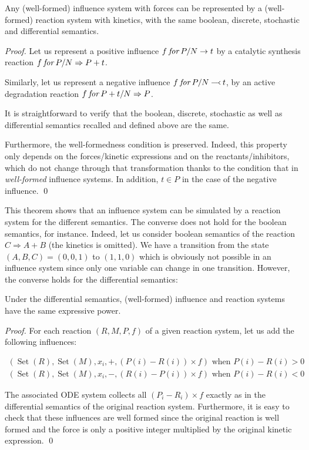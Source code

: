 \documentclass{llncs}
\newcommand\for{\mathbin{\text{\it for}}}
\newcommand\inhibits{\mathbin{-\!\Yleft}}
\DeclareMathOperator{\Set}{Set}
\begin{document}
\begin{theorem}\label{reprInflu}

  Any (well-formed) influence system with forces can be represented by a (well-formed) reaction system with kinetics,
  with the same boolean, discrete, stochastic and differential semantics.

\end{theorem}
\begin{proof}
  Let us represent a positive influence $f \for P/N \rightarrow t$ 
  by a catalytic synthesis reaction $f \for P/N\Rightarrow P+t$.

  Similarly, let us represent a negative influence $f \for P/N \inhibits t$,
  by an active degradation reaction $f \for P+t/N\Rightarrow P$.

  It is straightforward to verify that the boolean, discrete, stochastic as well as differential
  semantics recalled and defined above are the same.

  Furthermore, the well-formedness condition is preserved.
  Indeed, this property only depends on the
  forces/kinetic expressions and on the reactants/inhibitors, which %
  do not change through that transformation thanks to the condition that in
  \emph{well-formed} influence systems. In addition, $t \in P$ in the case of the
  negative influence.
  \qed

\end{proof}

This theorem shows that an influence system can be simulated by a reaction system for the different semantics.
The converse does not hold for the boolean semantics, for instance.
Indeed, let us consider boolean semantics of the reaction $C\Rightarrow A+B$ (the kinetics is omitted).
  We have a transition from the state $(A,B,C)=(0,0,1)$ to $(1,1,0)$ which is obviously
  not possible in an influence system since only one variable can change in one transition.  
However, the converse holds for the differential semantics:

\begin{theorem}
Under the differential semantics, (well-formed) influence and reaction systems have the same expressive power.
\end{theorem}
\begin{proof}

   For each reaction $(R, M, P, f)$ of a given
   reaction system, let us add the following influences:

   \begin{gather*}
      (\Set(R), \Set(M), x_i, +, (P(i) - R(i))\times f) \text{ when } P(i) - R(i) > 0\\
      (\Set(R), \Set(M), x_i, -, (R(i) - P(i))\times f) \text{ when } P(i) - R(i) < 0
   \end{gather*}

      The associated ODE system collects all $(P_i - R_i)\times
   f$ exactly as in the differential semantics of the original reaction
   system. Furthermore, it is easy to check that these influences are well formed since the
   original reaction is well formed and the force is only a positive integer
   multiplied by the original kinetic expression. 
\qed
\end{proof}
\end{document}
